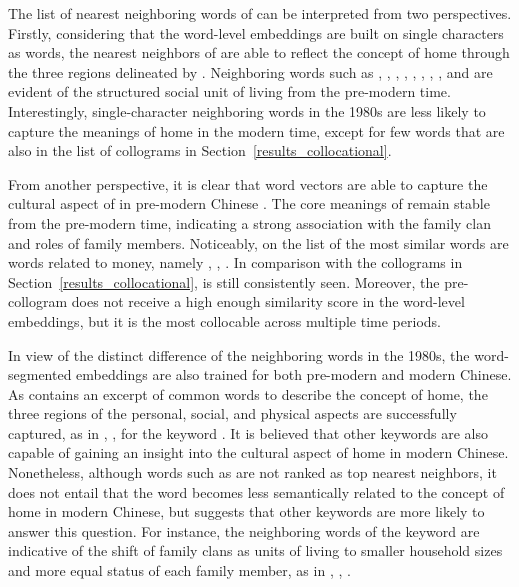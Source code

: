 The list of nearest neighboring words of \jia can be interpreted from two perspectives. Firstly, considering that the word-level embeddings are built on single characters as words, the nearest neighbors of \jia are able to reflect the concept of home through the three regions delineated by \textcite{sixsmith1986meaning}. Neighboring words such as , , , , , , , , and  are evident of the structured social unit of living from the pre-modern time. Interestingly, single-character neighboring words in the 1980s are less likely to capture the meanings of home in the modern time, except for few words that are also in the list of collograms in Section~\ref{results_collocational}.

From another perspective, it is clear that word vectors are able to capture the cultural aspect of \jia in pre-modern Chinese \parencite{hamilton2016cultural}. The core meanings of \jia remain stable from the pre-modern time, indicating a strong association with the family clan and roles of family members. Noticeably, on the list of the most similar words are words related to money, namely , , . In comparison with the collograms in Section~\ref{results_collocational},  is still consistently seen. Moreover, the pre-collogram  does not receive a high enough similarity score in the word-level embeddings, but it is the most collocable across multiple time periods.

In view of the distinct difference of the neighboring words in the 1980s, the word-segmented embeddings are also trained for both pre-modern and modern Chinese. As  contains an excerpt of common words to describe the concept of home, the three regions of the personal, social, and physical aspects are successfully captured, as in , ,  for the keyword \jia\rspace. It is believed that other keywords are also capable of gaining an insight into the cultural aspect of home in modern Chinese. Nonetheless, although words such as  are not ranked as top nearest neighbors, it does not entail that the word becomes less semantically related to the concept of home in modern Chinese, but suggests that other keywords are more likely to answer this question. For instance, the neighboring words of the keyword  are indicative of the shift of family clans as units of living to smaller household sizes and more equal status of each family member, as in , , .

